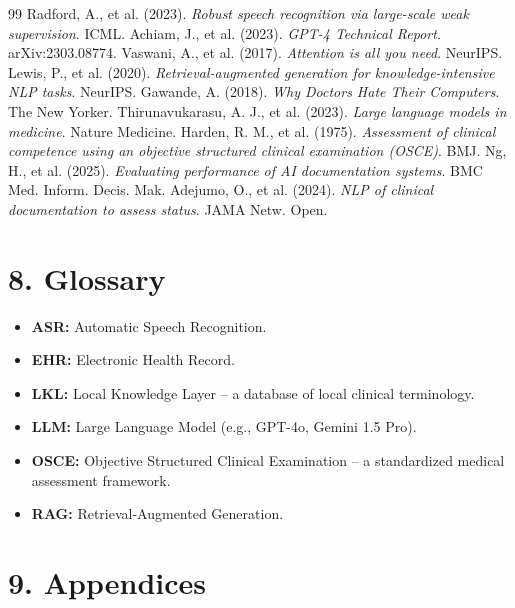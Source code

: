 \documentclass[12pt,a4paper]{article}
\begin{document}
\renewcommand{\refname}{7. References}
\begin{thebibliography}{99}
 Radford, A., et al. (2023). \textit{Robust speech recognition via large-scale weak supervision}. ICML.
 Achiam, J., et al. (2023). \textit{GPT-4 Technical Report}. arXiv:2303.08774.
 Vaswani, A., et al. (2017). \textit{Attention is all you need}. NeurIPS.
 Lewis, P., et al. (2020). \textit{Retrieval-augmented generation for knowledge-intensive NLP tasks}. NeurIPS.
 Gawande, A. (2018). \textit{Why Doctors Hate Their Computers}. The New Yorker.
 Thirunavukarasu, A. J., et al. (2023). \textit{Large language models in medicine}. Nature Medicine.
 Harden, R. M., et al. (1975). \textit{Assessment of clinical competence using an objective structured clinical examination (OSCE)}. BMJ.
 Ng, H., et al. (2025). \textit{Evaluating performance of AI documentation systems}. BMC Med. Inform. Decis. Mak.
 Adejumo, O., et al. (2024). \textit{NLP of clinical documentation to assess status}. JAMA Netw. Open.
\end{thebibliography}

\section*{8. Glossary}
\begin{itemize}
    \item \textbf{ASR:} Automatic Speech Recognition.
    \item \textbf{EHR:} Electronic Health Record.
    \item \textbf{LKL:} Local Knowledge Layer -- a database of local clinical terminology.
    \item \textbf{LLM:} Large Language Model (e.g., GPT-4o, Gemini 1.5 Pro).
    \item \textbf{OSCE:} Objective Structured Clinical Examination -- a standardized medical assessment framework.
    \item \textbf{RAG:} Retrieval-Augmented Generation.
\end{itemize}

\section*{9. Appendices}
\end{document}
